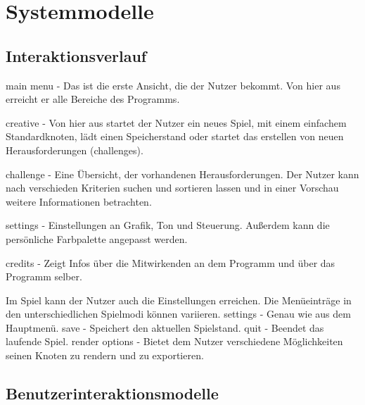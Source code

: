 \chapter{Systemmodelle}


\section{Interaktionsverlauf}

    main menu - Das ist die erste Ansicht, die der Nutzer bekommt. Von hier aus erreicht er alle Bereiche des Programms.
    
    creative - Von hier aus startet der Nutzer ein neues Spiel, mit einem einfachem Standardknoten, lädt einen Speicherstand oder startet das erstellen von neuen Herausforderungen (challenges).
    
    challenge - Eine Übersicht, der vorhandenen Herausforderungen. Der Nutzer kann nach verschieden Kriterien suchen und sortieren lassen und in einer Vorschau weitere Informationen betrachten.
    
    settings - Einstellungen an Grafik, Ton und Steuerung. Außerdem kann die persönliche Farbpalette angepasst werden.
    
    credits - Zeigt Infos über die Mitwirkenden an dem Programm und über das Programm selber.
    
	\begin{figure}[htbp]
	  \centering
	  
	\end{figure}
	
	Im Spiel kann der Nutzer auch die Einstellungen erreichen. Die Menüeinträge in den unterschiedlichen Spielmodi können variieren.
	settings - Genau wie aus dem Hauptmenü.
	save - Speichert den aktuellen Spielstand.
	quit - Beendet das laufende Spiel.
	render options - Bietet dem Nutzer verschiedene Möglichkeiten seinen Knoten zu rendern und zu exportieren.
    \begin{figure}[htbp]
	  \centering
	  
	\end{figure}


\section{Benutzerinteraktionsmodelle}

	\begin{figure}[htbp]
	  \centering
	  
	\end{figure}


